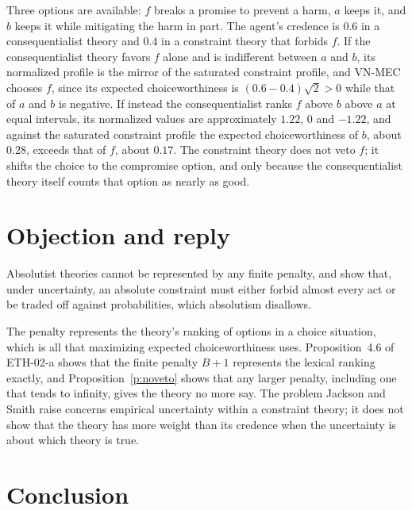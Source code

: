 \documentclass{situationist-preprint}
\begin{document}
Three options are available: $f$ breaks a promise to prevent a harm, $a$ keeps it, and $b$ keeps it while mitigating the harm in part. The agent's credence is $0.6$ in a consequentialist theory and $0.4$ in a constraint theory that forbids $f$. If the consequentialist theory favors $f$ alone and is indifferent between $a$ and $b$, its normalized profile is the mirror of the saturated constraint profile, and VN-MEC chooses $f$, since its expected choiceworthiness is $(0.6-0.4)\sqrt{2}>0$ while that of $a$ and $b$ is negative. If instead the consequentialist ranks $f$ above $b$ above $a$ at equal intervals, its normalized values are approximately $1.22$, $0$ and $-1.22$, and against the saturated constraint profile the expected choiceworthiness of $b$, about $0.28$, exceeds that of $f$, about $0.17$. The constraint theory does not veto $f$; it shifts the choice to the compromise option, and only because the consequentialist theory itself counts that option as nearly as good.

\section{Objection and reply}

\begin{objection}
Absolutist theories cannot be represented by any finite penalty, and \citet{JacksonSmith2006} show that, under uncertainty, an absolute constraint must either forbid almost every act or be traded off against probabilities, which absolutism disallows.
\end{objection}

\begin{reply}
The penalty represents the theory's ranking of options in a choice situation, which is all that maximizing expected choiceworthiness uses. Proposition~4.6 of ETH-02-a shows that the finite penalty $B+1$ represents the lexical ranking exactly, and Proposition~\ref{p:noveto} shows that any larger penalty, including one that tends to infinity, gives the theory no more say. The problem Jackson and Smith raise concerns empirical uncertainty within a constraint theory; it does not show that the theory has more weight than its credence when the uncertainty is about which theory is true.
\end{reply}

\section{Conclusion}
\end{document}
